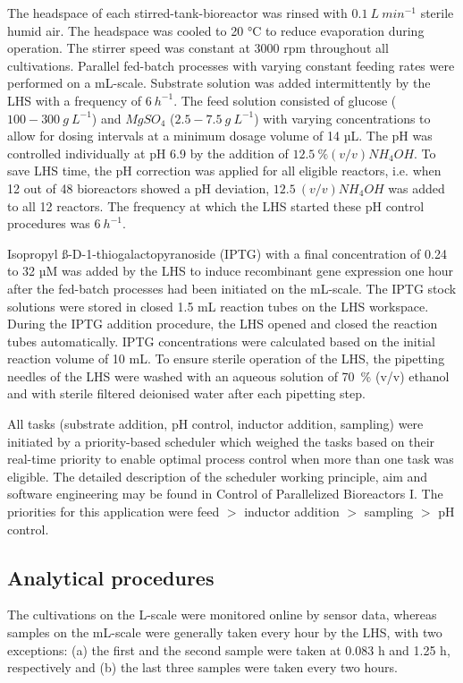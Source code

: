 \documentclass[sn-standardnature]{sn-jnl}%
\theoremstyle{thmstyleone}%
\theoremstyle{thmstyletwo}%
\theoremstyle{thmstylethree}%
\begin{document}
The headspace of each stirred-tank-bioreactor was rinsed with $0.1\ L\ min^{-1}$ sterile humid air.
The headspace was cooled to 20 °C to reduce evaporation during operation.
The stirrer speed was constant at 3000 rpm throughout all cultivations.
Parallel fed-batch processes with varying constant feeding rates were performed on a mL-scale.
Substrate solution was added intermittently by the LHS with a frequency of $6\ h^{-1}$.
The feed solution consisted of glucose ($100 - 300\ g\ L^{-1}$) and $MgSO_{4}$ ($2.5 - 7.5\ g\ L^{-1}$) with varying concentrations to allow for dosing intervals at a minimum dosage volume of 14 µL.
The pH was controlled individually at pH 6.9 by the addition of $12.5\ \% (v/v) NH_{4}OH$.
To save LHS time, the pH correction was applied for all eligible reactors, i.e. when 12 out of 48 bioreactors showed a pH deviation, $12.5\ (v/v) NH_{4}OH$ was added to all 12 reactors.
The frequency at which the LHS started these pH control procedures was $6\ h^{-1}$.

Isopropyl ß-D-1-thiogalactopyranoside (IPTG) with a final concentration of 0.24 to 32 µM was added by the LHS to induce recombinant gene expression one hour after the fed-batch processes had been initiated on the mL-scale.
The IPTG stock solutions were stored in closed 1.5 mL reaction tubes on the LHS workspace.
During the IPTG addition procedure, the LHS opened and closed the reaction tubes automatically.
IPTG concentrations were calculated based on the initial reaction volume of 10 mL.
To ensure sterile operation of the LHS, the pipetting needles of the LHS were washed with an aqueous solution of 70~\% (v/v) ethanol and with sterile filtered deionised water after each pipetting step.

All tasks (substrate addition, pH control, inductor addition, sampling) were initiated by a priority-based scheduler which weighed the tasks based on their real-time priority to enable optimal process control when more than one task was eligible.
The detailed description of the scheduler working principle, aim and software engineering may be found in Control of Parallelized Bioreactors I.
The priorities for this application were feed $>$ inductor addition $>$ sampling $>$ pH control.

\subsection{Analytical procedures}
The cultivations on the L-scale were monitored online by sensor data, whereas samples on the mL-scale were generally taken every hour by the LHS, with two exceptions:
(a) the first and the second sample were taken at 0.083 h and 1.25 h, respectively and (b) the last three samples were taken every two hours.
\end{document}
